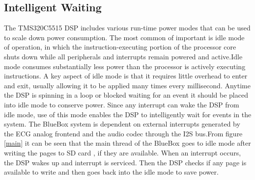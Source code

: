 \subsection{Intelligent Waiting}
The TMS320C5515 DSP includes various run-time power modes that can be used to scale down power consumption. The most common of important is idle mode of operation, in which the instruction-executing portion of the processor core shuts down while all peripherals and interrupts remain powered and active.Idle mode consumes substantially less power than the 
processor is actively executing instructions. A key aspect of idle mode is that it requires little overhead to enter and exit, usually allowing it to be applied many times every millisecond. Anytime the DSP is spinning in a loop or blocked waiting for an event it should be placed into idle mode to conserve power. Since any interrupt can wake the DSP from idle mode, use of this mode enables the DSP to intelligently wait for events in the system.  
The BlueBox system is dependent on external interrupts generated by the ECG analog frontend and the audio codec through the I2S bus.From figure \ref{main} it can be seen that the main thread of the BlueBox goes to idle mode after writing the pages to SD card , if they are available. When an interrupt occurs, the DSP wakes up and interrupt is serviced. Then the DSP checks if any page is available to write and then goes back into the idle mode to save power. 


